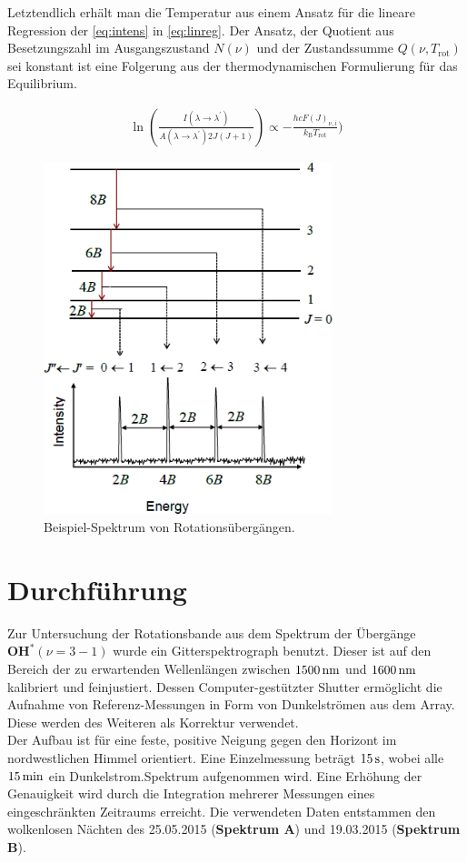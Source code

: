 \documentclass[numbers=noenddot,a4paper,notitlepage,twoside,BCOR15mm]{scrartcl}
\newcommand{\ix}[1]{_\text{#1}}
\newcommand{\fett}[1]{\textbf{#1}}
\begin{document}
		Letztendlich erhält man die Temperatur aus einem Ansatz für die lineare Regression der \autoref{eq:intens} in \autoref{eq:linreg}. Der Ansatz, der Quotient aus Besetzungszahl im Ausgangszustand $N(\nu)$ und der Zustandssumme $Q(\nu,T\ix{rot})$ sei konstant ist eine Folgerung aus der thermodynamischen Formulierung für das Equilibrium.

			\begin{align}
				\ln\left(\frac{I(\lambda\rightarrow\lambda^\prime)}{A(\lambda\rightarrow\lambda^\prime)2J(J+1)}\right)\propto-\frac{hcF(J)_{\nu,i}}{k\ix{B}T\ix{rot}}) \label{eq:linreg}
			\end{align}

			\begin{figure}[h]
				\centering
				\includegraphics[width=0.75\textwidth]{Rotational_spectrum_example.png}
				\caption{Beispiel-Spektrum von Rotationsübergängen. \cite{WikiRotat}}
				\label{img:bspspektr}
			\end{figure}

	\clearpage
	\section{Durchführung}

		Zur Untersuchung der Rotationsbande aus dem Spektrum der Übergänge $\fett{OH}^\ast(\nu=3-1)$ wurde ein Gitterspektrograph benutzt. Dieser ist auf den Bereich der zu erwartenden Wellenlängen zwischen $\unit[1500]{nm}$ und $\unit[1600]{nm}$ kalibriert und feinjustiert. Dessen Computer-gestützter Shutter ermöglicht die Aufnahme von Referenz-Messungen in Form von Dunkelströmen aus dem Array. Diese werden des Weiteren als Korrektur verwendet.\\
		Der Aufbau ist für eine feste, positive Neigung gegen den Horizont im nordwestlichen Himmel orientiert. Eine Einzelmessung beträgt $\unit[15]{s}$, wobei alle $\unit[15]{min}$ ein Dunkelstrom.Spektrum aufgenommen wird. Eine Erhöhung der Genauigkeit wird durch die Integration mehrerer Messungen eines eingeschränkten Zeitraums erreicht. Die verwendeten Daten entstammen den wolkenlosen Nächten des 25.05.2015 (\fett{Spektrum A}) und 19.03.2015 (\fett{Spektrum B}).
\end{document}
